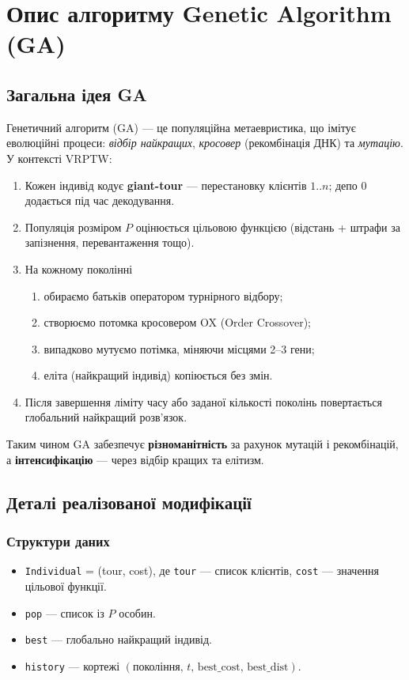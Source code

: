\documentclass[12pt,a4paper]{article}
\begin{document}
\section{Опис алгоритму Genetic Algorithm (GA)}
\subsection{Загальна ідея GA}
Генетичний алгоритм (GA) — це популяційна метаевристика,
що імітує еволюційні процеси:  
\emph{відбір найкращих}, \emph{кросовер} (рекомбінація ДНК)  
та \emph{мутацію}.  
У контексті VRPTW:

\begin{enumerate}
  \item Кожен індивід кодує \textbf{giant-tour} —
        перестановку клієнтів \(1..n\); депо $0$ додається
        під час декодування.
  \item Популяція розміром \(P\) оцінюється цільовою функцією
        (відстань + штрафи за запізнення, перевантаження тощо).
  \item На кожному поколінні
        \begin{enumerate}
          \item обираємо батьків оператором турнірного відбору;
          \item створюємо потомка кросовером OX (Order Crossover);
          \item випадково мутуємо потімка, міняючи місцями 2–3 гени;
          \item еліта (найкращий індивід) копіюється без змін.
        \end{enumerate}
  \item Після  завершення ліміту часу або 
        заданої кількості поколінь повертається глобальний
        найкращий розв’язок.
\end{enumerate}

Таким чином GA забезпечує \textbf{різноманітність}
за рахунок мутацій і рекомбінацій,  
а \textbf{інтенсифікацію} — через відбір кращих
та елітизм.

\subsection{Деталі реалізованої модифікації}
\subsubsection{Структури даних}
\begin{itemize}
  \item \texttt{Individual} = (tour, cost),  
        де \texttt{tour} — список клієнтів,  
        \texttt{cost} — значення цільової функції.
  \item \texttt{pop} — список із \(P\) особин.
  \item \texttt{best} — глобально найкращий індивід.
  \item \texttt{history} --- кортежі
        \((\text{покоління},\,t,\,
        \text{best\_cost},\,\text{best\_dist})\).
\end{itemize}
\end{document}

